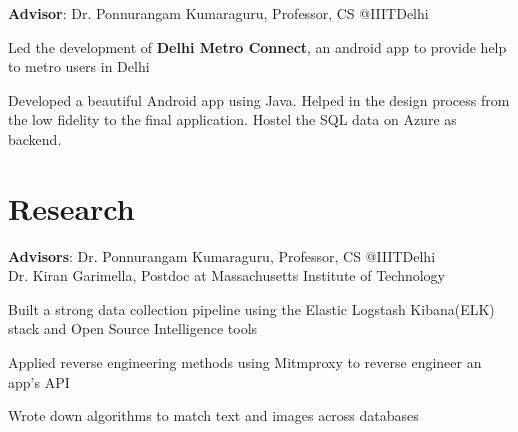 \documentclass[]{deedy-resume-reversed}
\begin{document}
\begin{minipage}[t]{0.60\textwidth}
\textbf{Advisor}: Dr. Ponnurangam Kumaraguru, Professor, CS @IIITDelhi
\begin{tightemize}
\item Led the development of \textbf{Delhi Metro Connect}, an android app to provide help to metro users in Delhi
\item Developed a beautiful Android app using Java. Helped in the design process from the low fidelity to the final application. Hostel the SQL data on Azure as backend.
\end{tightemize}

\sectionsep



\section{Research}

\textbf{Advisors}: Dr. Ponnurangam Kumaraguru, Professor, CS @IIITDelhi \\
                   Dr. Kiran Garimella, Postdoc at Massachusetts Institute of Technology
\begin{tightemize}
\item Built a strong data collection pipeline using the Elastic Logstash Kibana(ELK) stack and Open Source Intelligence tools
\item Applied reverse engineering methods using Mitmproxy to reverse engineer an app's API
\item Wrote down algorithms to match text and images across databases
\end{tightemize}


\end{minipage}
\end{document}
